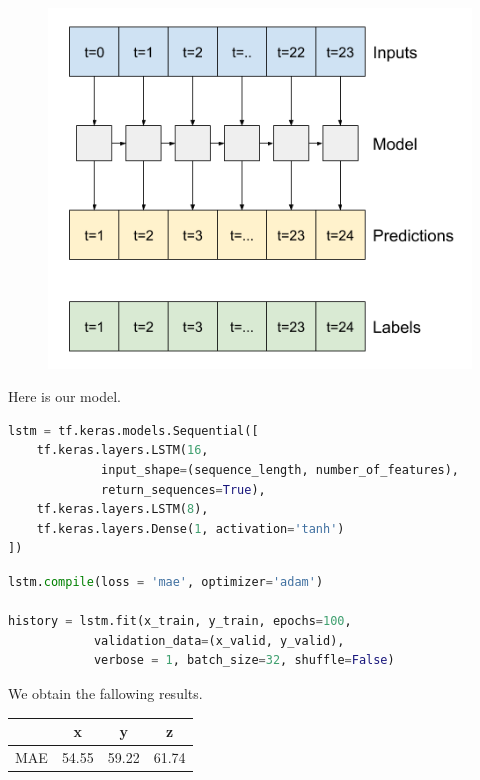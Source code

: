 \begin{figure}[H]
\centering
  \includegraphics[scale=0.35]{img/task_1/fig2.png}
  \label{fig: }
\end{figure}


Here is our model.

\begin{lstlisting}[language=Python]
lstm = tf.keras.models.Sequential([
	tf.keras.layers.LSTM(16, 
		     input_shape=(sequence_length, number_of_features), 
		     return_sequences=True),
	tf.keras.layers.LSTM(8),
	tf.keras.layers.Dense(1, activation='tanh')
])
\end{lstlisting}

\begin{lstlisting}[language=Python]
lstm.compile(loss = 'mae', optimizer='adam')

history = lstm.fit(x_train, y_train, epochs=100, 
			validation_data=(x_valid, y_valid), 
			verbose = 1, batch_size=32, shuffle=False)
\end{lstlisting}

We obtain the fallowing results.

\begin{center}
\begin{tabular}{| c | c | c | c |} 
\hline
 & x & y & z  \\ [0.5ex] 
\hline
\hline
MAE & 54.55 & 59.22 & 61.74 \\
\hline
\end{tabular}
\end{center}

